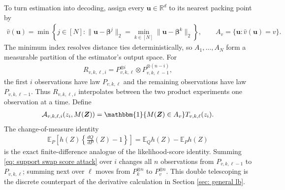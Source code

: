 \documentclass[letterpaper,12pt]{article}
\numberwithin{equation}{section}
\theoremstyle{plain}
\numberwithin{Theorem}{section}
\numberwithin{proposition}{section}
\numberwithin{Lemma}{section}
{
	\theoremstyle{definition}
	\newtheorem{Definition}{Definition}
	\newtheorem{example}{Example}
	\numberwithin{example}{section}
	\newtheorem{fact}{Fact}
	\numberwithin{fact}{section}
	\newtheorem{remark}{Remark}
}
\newcommand{\A}{\mathcal{A}}
\newcommand{\1}{\mathbbm{1}}
\def\bbeta{{\boldsymbol{\beta}}}
\def\E{\mathbb{E}}
\begin{document}
To turn estimation into decoding, assign every $\bm u\in\mathbb R^d$ to its nearest packing point by
\begin{align*}
\widehat v(\bm u)=\min\left\{j\in[N]:
\|\bm u-\bbeta^j\|_2=\min_{k\in[N]}\|\bm u-\bbeta^k\|_2\right\},
\qquad A_v=\{\bm u:\widehat v(\bm u)=v\}.
\end{align*}
The minimum index resolves distance ties deterministically, so $A_1,\ldots,A_N$ form a measurable partition of the estimator's output space.  For
\begin{align*}
	R_{v,k,\ell,i}
	=P_{v,k,\ell}^{\otimes i}\otimes
	P_{v,k,\ell-1}^{\otimes(n-i)},
\end{align*}
the first $i$ observations have law $P_{v,k,\ell}$ and the remaining observations have law $P_{v,k,\ell-1}$.  Thus $R_{v,k,\ell,i}$ interpolates between the two product experiments one observation at a time.  Define
\begin{align}
	\A_{v,k,\ell,i}(z_i,M(\bm Z))
	=\1\{M(\bm Z)\in A_v\}T_{v,k,\ell}(z_i).               \label{eq: support swap score attack}
\end{align}
The change-of-measure identity
\begin{align*}
	\E_{P}\!\left[h(Z)\left\{\frac{dQ}{dP}(Z)-1\right\}\right]
	=\E_Qh(Z)-\E_Ph(Z)
\end{align*}
is the exact finite-difference analogue of the likelihood-score identity.  Summing \eqref{eq: support swap score attack} over $i$ changes all $n$ observations from $P_{v,k,\ell-1}$ to $P_{v,k,\ell}$; summing next over $\ell$ moves from $P_k^{\otimes n}$ to $P_v^{\otimes n}$.  This double telescoping is the discrete counterpart of the derivative calculation in Section \ref{sec: general lb}.
\end{document}
